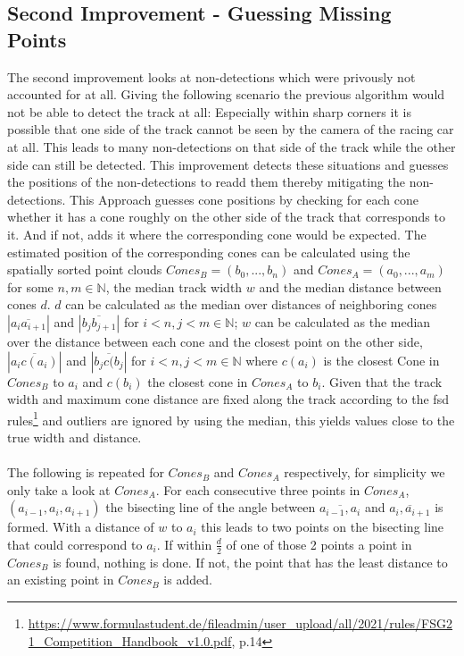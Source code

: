 \subsection{Second Improvement - Guessing Missing Points}
The second improvement looks at non-detections which were privously not accounted for at all. Giving the following scenario the previous algorithm would not be able to detect the track at all: Especially within sharp corners it is possible that one side of the track cannot be seen by the camera of the racing car at all. This leads to many non-detections on that side of the track while the other side can still be detected. This improvement detects these situations and guesses the positions of the non-detections to readd them thereby mitigating the non-detections.
This Approach guesses cone positions by checking for each cone whether it has a cone roughly on the other side of the track that corresponds to it. And if not, adds it where the corresponding cone would be expected. The estimated position of the corresponding cones can be calculated using the spatially sorted point clouds $Cones_B = (b_0,...,b_n)$ and $Cones_A = (a_0,...,a_m)$ for some $n,m \in \mathbb{N}$, the median track width $w$ and the median distance between cones $d$. $d$ can be calculated as the median over distances of neighboring cones $|\overline{a_i a_{i+1}}|$ and $|\overline{b_j b_{j+1}}|$ for $i<n,j<m \in \mathbb{N}$; $w$ can be calculated as the median over the distance between each cone and the closest point on the other side, $|\overline{a_i c(a_{i})}|$ and $|\overline{b_j c(b_{j}}|$ for $i<n,j<m \in \mathbb{N}$ where $c(a_i)$ is the closest Cone in $Cones_B$ to $a_i$ and $c(b_i)$ the closest cone in $Cones_A$ to $b_i$. Given that the track width and maximum cone distance are fixed along the track according to the \ac{fsd} rules\footnote{\url{https://www.formulastudent.de/fileadmin/user_upload/all/2021/rules/FSG21_Competition_Handbook_v1.0.pdf}, p.14} and outliers are ignored by using the median, this yields values close to the true width and distance.\\
\\The following is repeated for $Cones_B$ and $Cones_A$ respectively, for simplicity we only take a look at $Cones_A$. For each consecutive three points in $Cones_A$, $(a_{i-1},a_{i},a_{i+1})$ the bisecting line of the angle between $\overline{a_{i-1},a_{i}}$ and $\overline{a_{i},a_{i+1}}$ is formed. With a distance of $w$ to $a_{i}$ this leads to two points on the bisecting line that could correspond to  $a_{i}$. If within $\frac{d}{2}$ of one of those 2 points a point in $Cones_B$ is found, nothing is done. If not,  the point that has the least distance to an existing point in $Cones_B$ is added. \\

